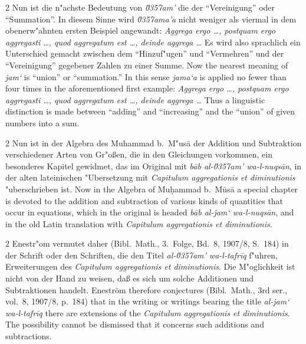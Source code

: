 \documentclass[10pt,a4paper]{article}
\renewcommand{\switchcolumn}{\syncronize\nointerlineskip\columnbreak}
\newcommand{\enquote}[1]{``#1''}
\begin{document}
\begin{paracol}{2}
Nun ist die n"achste Bedeutung von \textit{\u0357{}am'} die der \enquote{Vereinigung} oder \enquote{Summation}. In diesem Sinne wird \textit{\u0357{}ama'a} nicht weniger als viermal in dem obenerw"ahnten ersten Beispiel angewandt: \textit{Aggrega ergo \ldots{}, postquam ergo aggregasti \ldots{}, quod aggregatum est \ldots{}, deinde aggrega \ldots{}} Es wird also sprachlich ein Unterschied gemacht zwischen dem \enquote{Hinzuf"ugen} und \enquote{Vermehren} und der \enquote{Vereinigung} gegebener Zahlen zu einer Summe.
\switchcolumn
Now the nearest meaning of \textit{jam`} is ``union'' or ``summation.'' In this sense \textit{jama`a} is applied no fewer than four times in the aforementioned first example: \textit{Aggrega ergo \ldots{}, postquam ergo aggregasti \ldots{}, quod aggregatum est \ldots{}, deinde aggrega \ldots{}} Thus a linguistic distinction is made between ``adding'' and ``increasing'' and the ``union'' of given numbers into a sum.
\end{paracol}

\begin{paracol}{2}
Nun ist in der Algebra des Muhammad b.\ M"us\=a der Addition und Subtraktion verschiedener Arten von Gr"o\ss{}en, die in den Gleichungen vorkommen, ein besonderes Kapitel gewidmet, das im Original mit \textit{b\=ab al-\u0357{}am' wa-l-nuqs\=an}, in der alten lateinischen "Ubersetzung mit \textit{Capitulum aggregationis et diminutionis} "uberschrieben ist.
\switchcolumn
Now in the Algebra of Mu\d{h}ammad b.\ M\=us\=a a special chapter is devoted to the addition and subtraction of various kinds of quantities that occur in equations, which in the original is headed \textit{b\=ab al-jam` wa-l-nuqs\=an}, and in the old Latin translation with \textit{Capitulum aggregationis et diminutionis}.
\end{paracol}

\begin{paracol}{2}
Enestr"om vermutet daher (Bibl.\ Math., 3.\ Folge, Bd.\ 8, 1907/8, S.\ 184) in der Schrift oder den Schriften, die den Titel \textit{al-\u0357{}am' wa-l-tafr\={i}q} f"uhren, Erweiterungen des \textit{Capitulum aggregationis et diminutionis}. Die M"oglichkeit ist nicht von der Hand zu weisen, da\ss{} es sich um solche Additionen und Subtraktionen handelt.
\switchcolumn
Enestr\"om therefore conjectures (Bibl.\ Math., 3rd ser., vol.\ 8, 1907/8, p.\ 184) that in the writing or writings bearing the title \textit{al-jam` wa-l-tafr\={i}q} there are extensions of the \textit{Capitulum aggregationis et diminutionis}. The possibility cannot be dismissed that it concerns such additions and subtractions.
\end{paracol}
\end{document}
